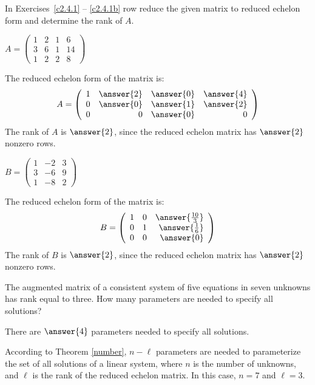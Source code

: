 \documentclass{ximera}
\begin{document}
\noindent In Exercises~\ref{c2.4.1} -- \ref{c2.4.1b} row reduce the given 
matrix to reduced echelon form and determine the rank of $A$.
\begin{exercise} \label{c2.4.1}
$A=\left(\begin{array}{rrrr}
1 &  2 & 1 & 6\\
3 &  6 & 1 & 14\\
1 &  2 & 2 & 8
         \end{array}\right)$
       \begin{prompt}
       The reduced echelon form of the matrix is:
\[
A = \left(\begin{array}{rrrr} 1 & \answer{2} & \answer{0} & \answer{4} \\ 0 & \answer{0} & \answer{1} & \answer{2} \\ 0 & 0 & \answer{0}
& 0\end{array}\right)
\]
The rank of $A$ is $\answer{2}$, since the reduced echelon matrix has $\answer{2}$ nonzero
rows.         
       \end{prompt}
\end{exercise}
\begin{exercise} \label{c2.4.1b}
$B=\left(\begin{array}{rrr}
1 &  -2 & 3\\
3 &  -6 & 9 \\
1 &  -8 & 2
         \end{array}\right)$
       \begin{prompt}
       The reduced echelon form of the matrix is:
\[
B=\left(\begin{array}{rrr} 1 & 0 & \answer{\frac{10}{3}} \\ 
0 & 1 & \answer{\frac{1}{6}} \\ 0 & 0 & \answer{0} \end{array}\right)
\]
The rank of $B$ is $\answer{2}$, since the reduced echelon matrix has $\answer{2}$ nonzero
rows.
       \end{prompt}
\end{exercise}

\begin{exercise} \label{c2.4.2}
The augmented matrix of a consistent system of five equations in seven
unknowns has rank equal to three.  How many parameters are needed to
specify all solutions?
\begin{prompt}
  There are $\answer{4}$ parameters needed to specify all solutions.
\end{prompt}
\begin{hint}
  According to Theorem \ref{number}, $n - \ell$
parameters are needed to parameterize the set of all solutions of a
linear system, where $n$ is the number of unknowns, and $\ell$ is the
rank of the reduced echelon matrix.  In this case, $n = 7$ and $\ell =
3$.
\end{hint}
\end{exercise}
\end{document}
